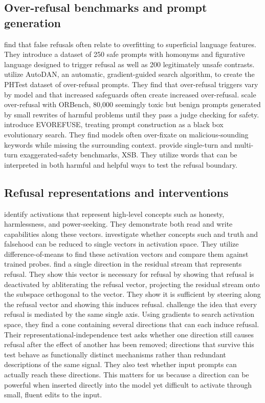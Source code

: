 \documentclass{article}
\begin{document}
\subsection{Over-refusal benchmarks and prompt generation}
    \citet{rottger2024xstest} find that false refusals often relate to overfitting to superficial language features. They introduce a dataset of 250 safe prompts with homonyms and figurative language designed to trigger refusal as well as 200 legitimately unsafe contrasts. \citet{an2024phtest} utilize AutoDAN, an automatic, gradient-guided search algorithm, to create the PHTest dataset of over-refusal prompts. They find that over-refusal triggers vary by model and that increased safeguards often create increased over-refusal. \citet{cui2024orbench} scale over-refusal with ORBench, 80{,}000 seemingly toxic but benign prompts generated by small rewrites of harmful problems until they pass a judge checking for safety. \citet{wu2025evorefuse} introduce EVOREFUSE, treating prompt construction as a black box evolutionary search. They find models often over-fixate on malicious-sounding keywords while missing the surrounding context. \citet{yuan2025beyond} provide single-turn and multi-turn exaggerated-safety benchmarks, XSB. They utilize words that can be interpreted in both harmful and helpful ways to test the refusal boundary.


\subsection{Refusal representations and interventions}
    \citet{zou2023representation} identify activations that represent high-level concepts such as honesty, harmlessness, and power-seeking. They demonstrate both read and write capabilities along these vectors. \citet{marks2024geometry} investigate whether concepts such and truth and falsehood can be reduced to single vectors in activation space. They utilize difference-of-means to find these activation vectors and compare them against trained probes. \citet{arditi2024refusal} find a single direction in the residual stream that represents refusal. They show this vector is necessary for refusal by showing that refusal is deactivated by abliterating the refusal vector, projecting the residual stream onto the subspace orthogonal to the vector. They show it is sufficient by steering along the refusal vector and showing this induces refusal.
    \citet{wollschlager2025geometry} challenge the idea that every refusal is mediated by the same single axis. Using gradients to search activation space, they find a cone containing several directions that can each induce refusal. Their representational-independence test asks whether one direction still causes refusal after the effect of another has been removed; directions that survive this test behave as functionally distinct mechanisms rather than redundant descriptions of the same signal. They also test whether input prompts can actually reach these directions. This matters for us because a direction can be powerful when inserted directly into the model yet difficult to activate through small, fluent edits to the input.
\end{document}
